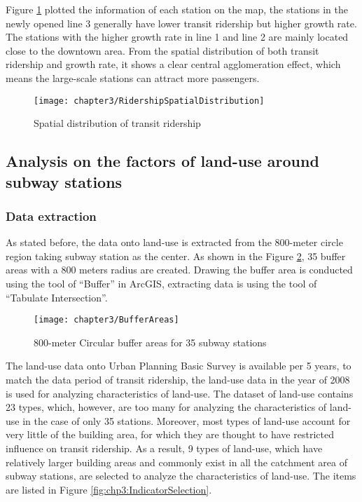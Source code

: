 %
Figure \ref{fig:chp3:RidershipSpatialDistribution} plotted the information of each station on the map, the stations in the newly opened line 3 generally have lower transit ridership but higher growth rate. The stations with the higher growth rate in line 1 and line 2 are mainly located close to the downtown area. From the spatial distribution of both transit ridership and growth rate, it shows a clear central agglomeration effect, which means the large-scale stations can attract more passengers.

%
\begin{figure}[htbp]
	\centering
	\texttt{[image: chapter3/RidershipSpatialDistribution]}
	\caption{Spatial distribution of transit ridership}
	\label{fig:chp3:RidershipSpatialDistribution}
\end{figure}

%
\subsection{Analysis on the factors of land-use around subway stations}
%
\subsubsection{Data extraction}
%
As stated before, the data onto land-use is extracted from the 800-meter circle region taking subway station as the center. As shown in the Figure \ref{fig:chp3:BufferAreas}, 35 buffer areas with a 800 meters radius are created. Drawing the buffer area is conducted using the tool of “Buffer” in ArcGIS, extracting data is using the tool of “Tabulate Intersection”.

%
\begin{figure}[htbp]
	\centering
	\texttt{[image: chapter3/BufferAreas]}
	\caption{800-meter Circular buffer areas for 35 subway stations}
	\label{fig:chp3:BufferAreas}
\end{figure}

%
The land-use data onto Urban Planning Basic Survey is available per 5 years, to match the data period of transit ridership, the land-use data in the year of 2008 is used for analyzing characteristics of land-use. The dataset of land-use contains 23 types, which, however, are too many for analyzing the characteristics of land-use in the case of only 35 stations. Moreover, most types of land-use account for very little of the building area, for which they are thought to have restricted influence on transit ridership. As a result, 9 types of land-use, which have relatively larger building areas and commonly exist in all the catchment area of subway stations, are selected to analyze the characteristics of land-use. The items are listed in Figure \ref{fig:chp3:IndicatorSelection}.

